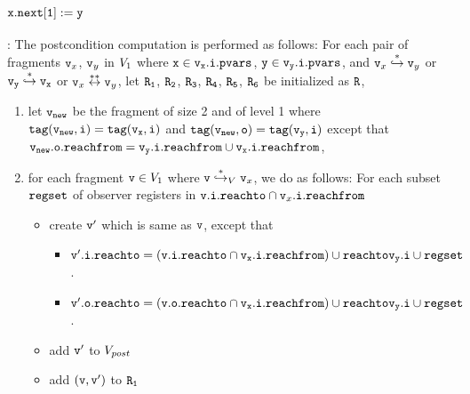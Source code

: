 \subsubsection{${\tt x.next[1]:= y}$}:
The postcondition computation is performed as follows:
For each pair of fragments $\mathtt{v}_x$, $\mathtt{v}_y$ in $V_1$ where $\tt x \in \mathtt{v}_x.\mathtt{i}.\mathtt{pvars}$, $\tt y \in\mathtt{v}_y.\mathtt{i}.\mathtt{pvars}$, and $\mathtt{v}_x \overset{*}\hookrightarrow \mathtt{v}_y$ or $\tt \mathtt{v}_y \overset{*}\hookrightarrow \mathtt{v}_x$ or $\mathtt{v}_x \overset{**}\leftrightarrow \mathtt{v}_y$, let $\tt R_1$, $\tt R_2$, $\tt R_3$, $\tt R_4$, $\tt R_5$, $\tt R_6$ be initialized as $\tt R$,  
\begin{enumerate}
\item let $\tt \mathtt{v}_{new}$ be the fragment of size 2 and of level 1 where $\tt tag(\mathtt{v}_{new},i) = tag(\mathtt{v}_x, i)$ and $\tt tag(\mathtt{v}_{new},o) = tag(\mathtt{v}_y,i)$ except that $\tt \mathtt{v}_{new}.\mathtt{o}.\mathtt{reachfrom} = \mathtt{v}_y.\mathtt{i}.\mathtt{reachfrom} \cup \mathtt{v}_x.\mathtt{i}.\mathtt{reachfrom}$,
\item  for each fragment $\mathtt{v} \in V_1$ where $\mathtt{v} \overset{*}\hookrightarrow_{V} \mathtt{v}_x$, we do as follows: For each subset $\mathtt{regset}$ of observer registers in $\mathtt{v}.\mathtt{i}.\mathtt{reachto} \cap \mathtt{v}_x.\mathtt{i}.\mathtt{reachfrom}$


\begin{itemize}
\item create $\mathtt{v}'$ which is same as $\mathtt{v}$, except that
\begin{itemize}
\item $\mathtt{v}'.\mathtt{i}.\mathtt{reachto} = (\tt \mathtt{v}.\mathtt{i}.\mathtt{reachto} \cap \mathtt{v}_x.\mathtt{i}.\mathtt{reachfrom}) \cup \mathtt{reachto}{\mathtt{v}_y.\mathtt{i}} \cup \mathtt{regset}$.
\item $\mathtt{v}'.\mathtt{o}.\mathtt{reachto} = (\tt \mathtt{v}.\mathtt{o}.\mathtt{reachto} \cap \mathtt{v}_x.\mathtt{i}.\mathtt{reachfrom}) \cup \mathtt{reachto}{\mathtt{v}_y.\mathtt{i}} \cup \mathtt{regset}$.
\end{itemize}
\item add $\mathtt{v}'$ to $V_{post}$ 
\item add $(\mathtt{v},\mathtt{v}')$ to $\tt R_1$
\end{itemize}


\end{enumerate}
